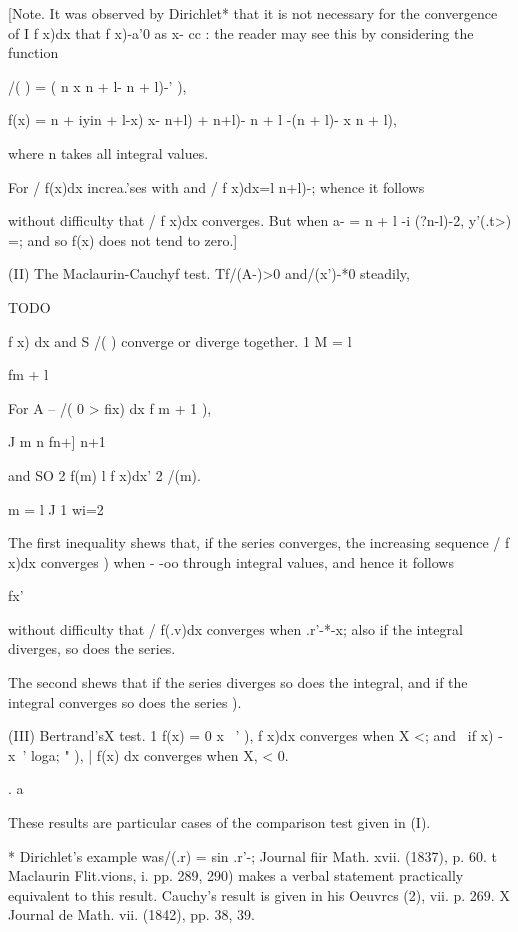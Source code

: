 [Note. It was observed by Dirichlet* that it is not necessary for the
convergence of I f x)dx that f x)-a'0 as x- cc : the reader may see
this by considering the function

/( ) = ( n x n + l- n + l)-' ),

f(x) = n + iyin + l-x) x- n+l) + n+l)- n + l -(n + l)- x n + l),

where n takes all integral values.

For / f(x)dx increa.'ses with and / f x)dx=l n+l)-; whence it follows

without difficulty that / f x)dx converges. But when a- = n + l -i
(?n-l)-2, y'(.t>) =; and so f(x) does not tend to zero.]

(II) The Maclaurin-Cauchyf test. Tf/(A-)>0 and/(x')-*0 steadily,

TODO

f x) dx and S /( ) converge or diverge together. 1 M = l

fm + l

For A -- /( 0 > fix) dx f m + 1 ),

J m n fn+] n+1

and SO 2 f(m) l f x)dx' 2 /(m).

  m = l J 1 wi=2

The first inequality shews that, if the series converges, the
increasing sequence / f x)dx converges ) when - -oo through
integral values, and hence it follows

fx'

without difficulty that / f(.v)dx converges when .r'-*-x; also if the
integral diverges, so does the series.

The second shews that if the series diverges so does the integral, and
if the integral converges so does the series ).

(III) Bertrand'sX test. 1 f(x) = 0 x ~' ), f x)dx converges when X <;
and \ if x) - x~' loga; " ), | f(x) dx converges when X, < 0.

. a

These results are particular cases of the comparison test given in
(I).

* Dirichlet's example was/(.r) = sin .r'-; Journal fiir Math. xvii.
(1837), p. 60. t Maclaurin Flit.vions, i. pp. 289, 290) makes a verbal
statement practically equivalent to this result. Cauchy's result is
given in his Oeuvrcs (2), vii. p. 269. X Journal de Math. vii. (1842),
pp. 38, 39.

%
%


